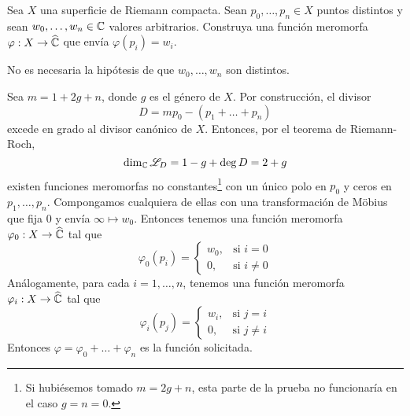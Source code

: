 \begin{exercise}
Sea $X$ una superficie de Riemann compacta. Sean $p_0, \dots, p_n \in X$ puntos distintos y sean $w_0, \dots, w_n \in \mathbb C$ valores arbitrarios. Construya una función meromorfa $\varphi : X \to \widehat {\mathbb C}$ que envía $\varphi(p_i) = w_i$.
\end{exercise}

\begin{remark}
No es necesaria la hipótesis de que $w_0, \dots, w_n$ son distintos.
\end{remark}

\begin{solution}
Sea $m = 1 + 2g + n$, donde $g$ es el género de $X$. Por construcción, el divisor
$$D = mp_0 - (p_1 + \dots + p_n)$$
excede en grado al divisor canónico de $X$. Entonces, por el teorema de Riemann-Roch,
$$\dim_\mathbb C \mathscr L_D = 1 - g + \deg D =  2 + g$$
existen funciones meromorfas no constantes\footnote{Si hubiésemos tomado $m = 2g + n$, esta parte de la prueba no funcionaría en el caso $g = n = 0$.} con un único polo en $p_0$ y ceros en $p_1, \dots, p_n$. Compongamos cualquiera de ellas con una transformación de Möbius que fija $0$ y envía $\infty \mapsto w_0$. Entonces tenemos una función meromorfa $\varphi_0 : X \to \widehat {\mathbb C}$ tal que
$$
\varphi_0(p_i) =
    \begin{cases}
        w_0, & \text{si } i = 0 \\
        0, & \text{si } i \ne 0
    \end{cases}
$$
Análogamente, para cada $i = 1, \dots, n$, tenemos una función meromorfa $\varphi_i : X \to \widehat {\mathbb C}$ tal que
$$
\varphi_i(p_j) =
    \begin{cases}
        w_i, & \text{si } j = i \\
        0, & \text{si } j \ne i
    \end{cases}
$$
Entonces $\varphi = \varphi_0 + \dots + \varphi_n$ es la función solicitada.
\end{solution}
